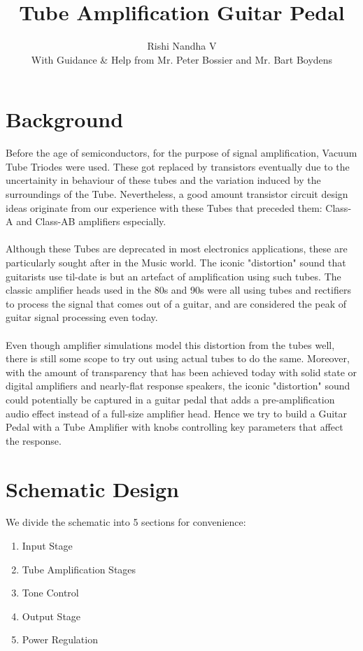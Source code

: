 \documentclass[11pt]{article}
\title{\LARGE{Tube Amplification Guitar Pedal\vspace{1mm} }}
\author{\Large{Rishi Nandha V\vspace{1mm} \\With Guidance \& Help from Mr. Peter Bossier and Mr. Bart Boydens}}
\newcommand{\tab}{\hspace*{6mm}}
\begin{document}
    
    \maketitle

    \section{Background}
\tab Before the age of semiconductors, for the purpose of signal amplification, Vacuum Tube Triodes were used. These got replaced by transistors eventually due to the uncertainity in behaviour of these tubes and the variation induced by the surroundings of the Tube. Nevertheless, a good amount transistor circuit design ideas originate from our experience with these Tubes that preceded them: Class-A and Class-AB amplifiers especially.\\~\\
\tab Although these Tubes are deprecated in most electronics applications, these are particularly sought after in the Music world. The iconic "distortion" sound that guitarists use til-date is but an artefact of amplification using such tubes. The classic amplifier heads used in the 80s and 90s were all using tubes and rectifiers to process the signal that comes out of a guitar, and are considered the peak of guitar signal processing even today.\\~\\
\tab Even though amplifier simulations model this distortion from the tubes well, there is still some scope to try out using actual tubes to do the same. Moreover, with the amount of transparency that has been achieved today with solid state or digital amplifiers and nearly-flat response speakers, the iconic "distortion" sound could potentially be captured in a guitar pedal that adds a pre-amplification audio effect instead of a full-size amplifier head. Hence we try to build a Guitar Pedal with a Tube Amplifier with knobs controlling key parameters that affect the response.
\section{Schematic Design}
We divide the schematic into 5 sections for convenience:
\begin{enumerate}
    \item Input Stage
    \item Tube Amplification Stages
    \item Tone Control
    \item Output Stage
    \item Power Regulation
\end{enumerate}
\newpage
\end{document}
